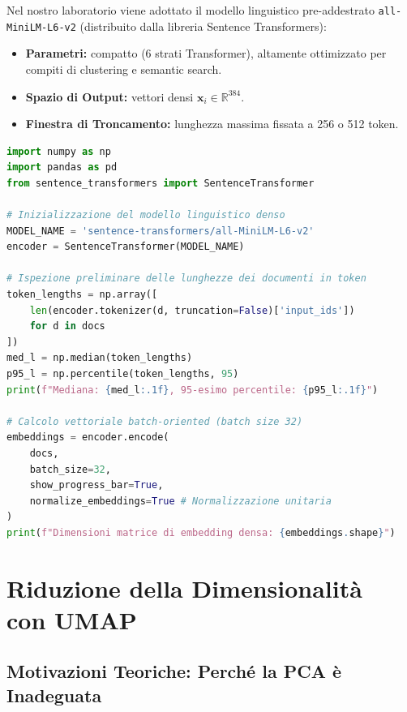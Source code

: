 Nel nostro laboratorio viene adottato il modello linguistico pre-addestrato \texttt{all-MiniLM-L6-v2} (distribuito dalla libreria Sentence Transformers):
\begin{itemize}
    \item \textbf{Parametri:} compatto (6 strati Transformer), altamente ottimizzato per compiti di clustering e semantic search.
    \item \textbf{Spazio di Output:} vettori densi $\mathbf{x}_i \in \mathbb{R}^{384}$.
    \item \textbf{Finestra di Troncamento:} lunghezza massima fissata a 256 o 512 token.
\end{itemize}

\begin{lstlisting}[language=Python, caption={Estrazione degli embedding di documento con Sentence Transformers.}]
import numpy as np
import pandas as pd
from sentence_transformers import SentenceTransformer

# Inizializzazione del modello linguistico denso
MODEL_NAME = 'sentence-transformers/all-MiniLM-L6-v2'
encoder = SentenceTransformer(MODEL_NAME)

# Ispezione preliminare delle lunghezze dei documenti in token
token_lengths = np.array([
    len(encoder.tokenizer(d, truncation=False)['input_ids'])
    for d in docs
])
med_l = np.median(token_lengths)
p95_l = np.percentile(token_lengths, 95)
print(f"Mediana: {med_l:.1f}, 95-esimo percentile: {p95_l:.1f}")

# Calcolo vettoriale batch-oriented (batch size 32)
embeddings = encoder.encode(
    docs, 
    batch_size=32, 
    show_progress_bar=True, 
    normalize_embeddings=True # Normalizzazione unitaria
)
print(f"Dimensioni matrice di embedding densa: {embeddings.shape}")
\end{lstlisting}

\FloatBarrier
\section[Riduzione Dimensionalità con UMAP]{Riduzione della Dimensionalità\\con UMAP}
\label{sec:lab-umap-reduction}

\FloatBarrier
\subsection{Motivazioni Teoriche: Perché la PCA è Inadeguata}
\label{subsec:lab-why-umap}

